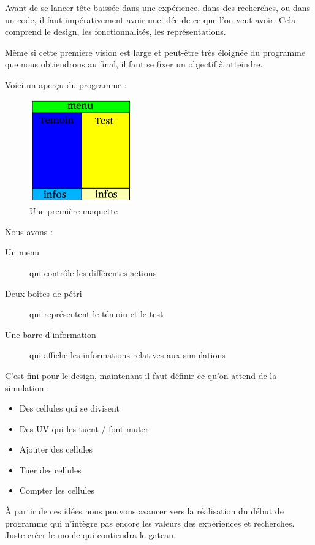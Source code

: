 Avant de se lancer tête baissée dans une expérience, dans des recherches, ou dans un code, il faut impérativement avoir une idée de ce que l'on veut avoir.
Cela comprend le design, les fonctionnalités, les représentations.

Même si cette première vision est large et peut-être très éloignée du programme que nous obtiendrons au final, il faut se fixer un objectif à atteindre.

Voici un aperçu du programme : 
\begin{figure}[H]
	\begin{center}
	  \includegraphics[width=12em]{Images/maquette.pdf}
	\end{center}
	\caption{Une première maquette}
	\label{Maquette}
\end{figure}

Nous avons : 
\begin{description}
	\item[Un menu] qui contrôle les différentes actions
	\item[Deux boites de pétri] qui représentent le témoin et le test
	\item[Une barre d'information] qui affiche les informations relatives aux simulations
\end{description}

C'est fini pour le design, maintenant il faut définir ce qu'on attend de la simulation : 
\begin{itemize}
	\item Des cellules qui se divisent
	\item Des UV qui les tuent / font muter
	\item Ajouter des cellules
	\item Tuer des cellules
	\item Compter les cellules
\end{itemize}

À partir de ces idées nous pouvons avancer vers la réalisation du début de programme qui n'intègre pas encore les valeurs des expériences et recherches. Juste créer le moule qui contiendra le gateau. 




